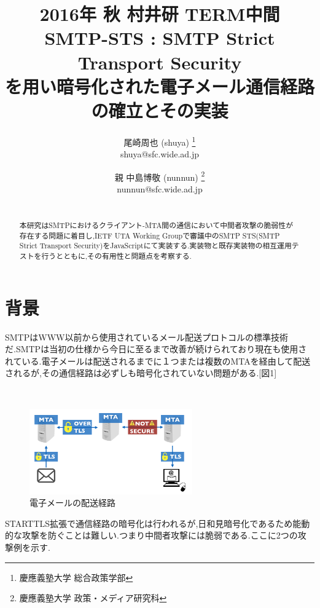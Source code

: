 \documentclass[a4j,10pt]{jsarticle}
\begin{document}

\title{2016年 秋 村井研 TERM中間\\
SMTP-STS : SMTP Strict Transport Security
\\を用い暗号化された電子メール通信経路の確立とその実装}

\author{
    尾崎周也 (shuya) \thanks{慶應義塾大学 総合政策学部}
    \\shuya@sfc.wide.ad.jp
    \and
    親 中島博敬 (nunnun) \thanks{慶應義塾大学 政策・メディア研究科}
    \\nunnun@sfc.wide.ad.jp
}


\begin{abstract}
\\
本研究はSMTPにおけるクライアント-MTA間の通信において中間者攻撃の脆弱性が存在する問題に着目し,IETF UTA Working Groupで審議中のSMTP STS(SMTP Strict Transport Security)\cite{draft}をJavaScriptにて実装する.実装物と既存実装物の相互運用テストを行うとともに,その有用性と問題点を考察する.
\end{abstract}

\maketitle
\thispagestyle{empty}

\section{背景}

SMTPはWWW以前から使用されているメール配送プロトコルの標準技術だ.SMTPは当初の仕様から今日に至るまで改善が続けられており現在も使用されている.電子メールは配送されるまでに１つまたは複数のMTAを経由して配送されるが,その通信経路は必ずしも暗号化されていない問題がある.[図1]
\begin{figure}[htbp]
　\begin{center}
      \includegraphics[width=7cm]{figure1.png}
      \caption{電子メールの配送経路}
    \end{center}
\end{figure}

STARTTLS拡張で通信経路の暗号化は行われるが,日和見暗号化であるため能動的な攻撃を防ぐことは難しい.つまり中間者攻撃には脆弱である.ここに2つの攻撃例を示す.
\end{document}
